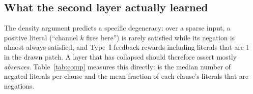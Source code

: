 \subsection{What the second layer actually learned}
\label{sec:composition}

The density argument predicts a specific degeneracy: over a sparse input, a positive literal
(``channel $k$ fires here'') is rarely satisfied while its negation is almost always
satisfied, and Type~I feedback rewards including literals that are $1$ in the drawn patch.
A layer that has collapsed should therefore assert mostly \emph{absences}. Table~\ref{tab:comp}
measures this directly:  is the median number of negated literals per clause and
 the mean fraction of each clause's literals that are negations.

\begin{table}[h]
\centering\small
\caption{Clause composition of each arm's final (classifying) layer.  is the
median clause size, / the median count of plain and negated literals,
 the mean negation fraction, and  the fraction of clauses with no
included literals.}
\label{tab:comp}
\end{table}


